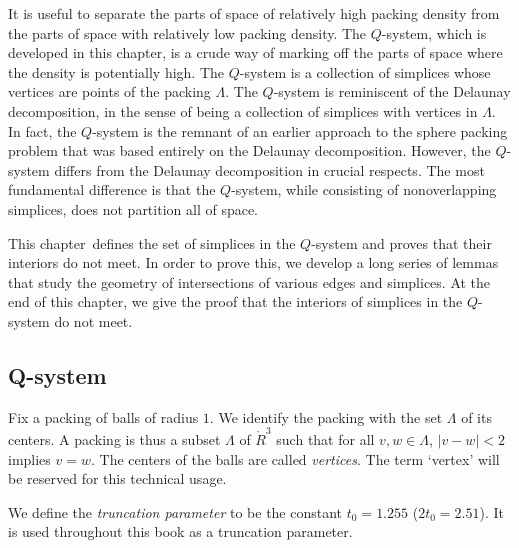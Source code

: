 It is useful to separate the parts of space of relatively high
packing density from the parts of space with relatively low
packing density.  The $Q$-system, which is developed in this
chapter, is a crude way of marking off the parts of space where the
density is potentially high.  The $Q$-system is a collection of
simplices whose vertices are points of the packing $\Lambda$. The
$Q$-system is reminiscent of the Delaunay decomposition, in the
sense of being a collection of simplices with vertices in
$\Lambda$.  In fact, the $Q$-system is the remnant of an earlier
approach to the sphere packing problem that was based entirely on the
Delaunay decomposition.  However, the $Q$-system differs from the
Delaunay decomposition in crucial respects.  The most fundamental
difference is that the $Q$-system, while consisting of
nonoverlapping simplices, does not partition all of space.

This chapter\ defines the set of simplices in the $Q$-system and
proves that their interiors do not meet.  In order to prove this,
we develop a long series of lemmas that study the geometry of
intersections of various edges and simplices.  At the end of this
chapter, we give the proof that the interiors of simplices in the
$Q$-system do not meet.


\subsection{Q-system}
\label{sec:Q-describe}
\label{sec:construction}



Fix a packing of balls of radius $1$. We identify the packing with
the set $\Lambda$ of its centers.  A packing is thus a subset
$\Lambda$ of $\ring{R}^3$ such that for all $v,w\in\Lambda$,
$|v-w|<2$ implies $v=w$. The centers of the balls are called {\it
{} vertices}. The term `vertex' will be reserved for
this technical usage.  


\begin{definition}  We define the {\it truncation parameter}
 to be the constant
$t_0=1.255$ ($2t_0 = 2.51$). It is used throughout this book as
a truncation parameter.
\end{definition}

